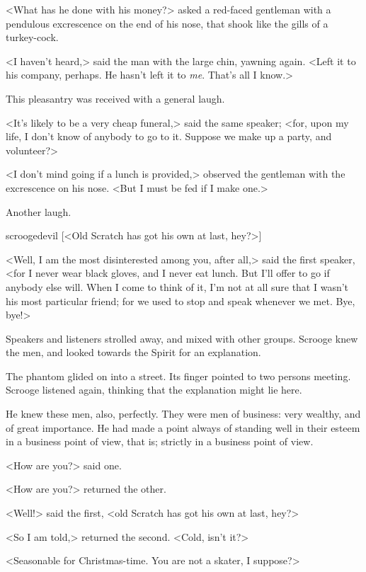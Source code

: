 <What has he done with his money?> asked a red-faced gentleman with a pendulous
excrescence on the end of his nose, that shook like the gills of a turkey-cock.

<I haven't heard,> said the man with the large chin, yawning again. <Left it to
his company, perhaps. He hasn't left it to \emph{me}. That's all I know.>

This pleasantry was received with a general laugh.

<It's likely to be a very cheap funeral,> said the same speaker; <for, upon my
life, I don't know of anybody to go to it. Suppose we make up a party, and
volunteer?>

<I don't mind going if a lunch is provided,> observed the gentleman with the
excrescence on his nose. <But I must be fed if I make one.>

Another laugh.

  \begin{colorbigpic}
    [\basicscale] 
    {scroogedevil}
    [<Old Scratch has got his own at last, hey?>]
  \end{colorbigpic}


<Well, I am the most disinterested among you, after all,> said the first
speaker, <for I never wear black gloves, and I never eat lunch. But I'll offer
to go if anybody else will. When I come to think of it, I'm not at all sure that
I wasn't his most particular friend; for we used to stop and speak whenever we
met. Bye, bye!>

Speakers and listeners strolled away, and mixed with other groups. Scrooge knew
the men, and looked towards the Spirit for an explanation.

The phantom glided on into a street. Its finger pointed to two persons meeting.
Scrooge listened again, thinking that the explanation might lie here.

He knew these men, also, perfectly. They were men of business: very wealthy, and
of great importance. He had made a point always of standing well in their esteem
in a business point of view, that is; strictly in a business point of view.

<How are you?> said one.

<How are you?> returned the other.

<Well!> said the first, <old Scratch has got his own at last, hey?>

<So I am told,> returned the second. <Cold, isn't it?>

<Seasonable for Christmas-time. You are not a skater, I suppose?>

